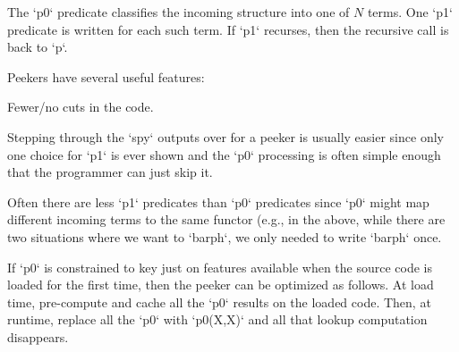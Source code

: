 The `p0` predicate classifies the incoming structure into one of $N$
terms. One `p1` predicate is written for each such term. If `p1`
recurses, then the recursive call is back to `p`.

Peekers have several  useful features: \bi \item Fewer/no cuts in the
code. \item Stepping through the `spy` outputs over for a peeker is
usually easier since only one choice for `p1` is ever shown and the
`p0` processing is often simple enough that the programmer can just
skip it. \item Often there are less `p1` predicates than `p0`
predicates since `p0` might map different incoming terms to the same
functor (e.g., in the above, while there are two situations where we
want to `barph`, we only needed to write `barph` once. \item If `p0`
is constrained to key just on features available when the source code
is loaded for the first time, then the peeker can be optimized as
follows. At load time, pre-compute and cache all the `p0` results on
the loaded code. Then, at runtime, replace all the `p0` with
`p0(X,X)` and all that lookup computation disappears. \ei
